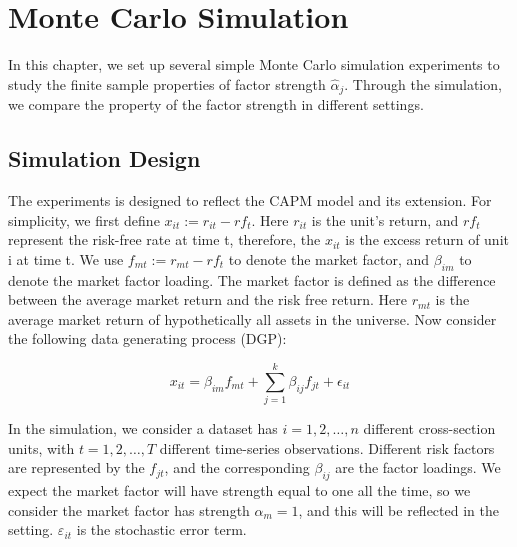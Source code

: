 \chapter{Monte Carlo Simulation}\label{MC}
	In this chapter, we set up several simple Monte Carlo simulation experiments to study the finite sample properties of factor strength $\hat{\alpha}_j$.
	Through the simulation, we compare the property of the factor strength in different settings.
	
\section{Simulation Design}
The experiments is designed to reflect the CAPM model and its extension.
For simplicity, we first define $x_{it} := r_{it}- rf_{t}$.
Here $r_{it}$ is the unit's return, and $rf_{t}$ represent the risk-free rate at time t, therefore, the $x_{it}$ is the excess return of unit i at time t.
We use $f_{mt}:=r_{mt} - rf_{t}$ to denote the market factor, and $\beta_{im}$ to denote the market factor loading.
The market factor is defined as the difference between the average market return and the risk free return.
Here $r_{mt}$ is the average market return of hypothetically all assets in the universe.
Now consider the following data generating process (DGP):
	
		\[ x_{it} = \beta_{im}f_{mt} +  \sum_{j=1}^k\beta_{ij}f_{jt} +\epsilon_{it}  \]
	


In the simulation, we consider a dataset has $i = 1, 2,\dots, n$ different cross-section units, with $t= 1, 2,\dots, T$ different time-series observations. 
Different risk factors are represented by the $f_{jt}$, and the corresponding $\beta_{ij}$ are the factor loadings.
We expect the market factor will have strength equal to one all the time, so we consider the market factor has strength $\alpha_m = 1$, and this will be reflected in the setting.
$\varepsilon_{it}$ is the stochastic error term.

